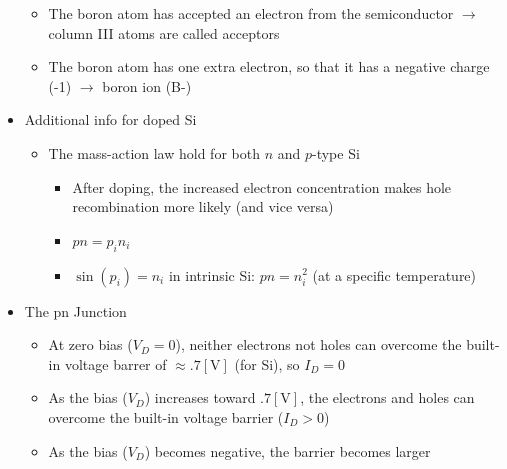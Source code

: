 \begin{itemize}
\begin{itemize}
\begin{itemize}
        \end{itemize}

      \item The boron atom has accepted an electron from the semiconductor $\to$ column III atoms are called acceptors

      \item The boron atom has one extra electron, so that it has a negative charge (-1) $\to$ boron ion (B-)

    \end{itemize}

  \item Additional info for doped Si

    \begin{itemize}

      \item The mass-action law hold for both $n$ and $p$-type Si

        \begin{itemize}

          \item After doping, the increased electron concentration makes hole recombination more likely (and vice versa)

          \item $pn=p_in_i$

          \item $\sin(p_i)=n_i$ in intrinsic Si: $pn=n_i^2$ (at a specific temperature)

        \end{itemize}

    \end{itemize}

  \item The pn Junction

    \begin{itemize}

      \item At zero bias ($V_D=0$), neither electrons not holes can overcome the built-in voltage barrer of $\approx.7[\si{\volt}]$ (for Si), so $I_D=0$

      \item As the bias ($V_D$) increases toward $.7[\si{\volt}]$, the electrons and holes can overcome the built-in voltage barrier ($I_D>0$)

      \item As the bias ($V_D$) becomes negative, the barrier becomes larger

        \begin{itemize}


\end{itemize}
\end{itemize}
\end{itemize}
